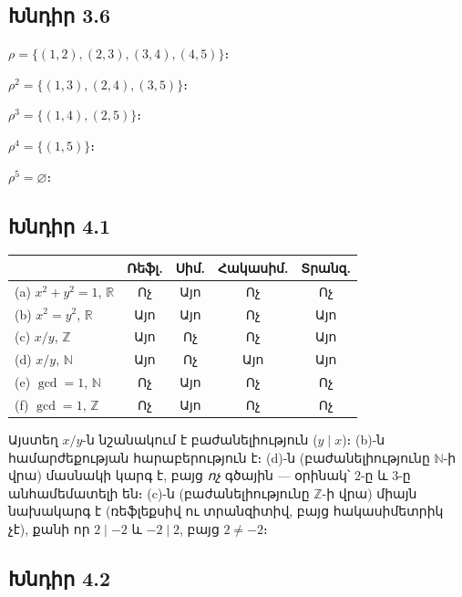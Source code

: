 
\subsection*{Խնդիր 3.6}

$\rho=\{(1,2),(2,3),(3,4),(4,5)\}$։

$\boxed{\rho^2=\{(1,3),(2,4),(3,5)\}}$։

$\boxed{\rho^3=\{(1,4),(2,5)\}}$։

$\boxed{\rho^4=\{(1,5)\}}$։

$\boxed{\rho^5=\varnothing}$։


\subsection*{Խնդիր 4.1}

\begin{tabular}{l|cccc}
& Ռեֆլ. & Սիմ. & Հակասիմ. & Տրանզ. \\\hline
(a) $x^2+y^2=1$, $\mathbb{R}$ & Ոչ & Այո & Ոչ & Ոչ \\
(b) $x^2=y^2$, $\mathbb{R}$   & Այո & Այո & Ոչ & Այո \\
(c) $x/y$, $\mathbb{Z}$       & Այո & Ոչ  & Ոչ  & Այո \\
(d) $x/y$, $\mathbb{N}$       & Այո & Ոչ  & Այո & Այո \\
(e) $\gcd=1$, $\mathbb{N}$    & Ոչ  & Այո & Ոչ  & Ոչ \\
(f) $\gcd=1$, $\mathbb{Z}$    & Ոչ  & Այո & Ոչ  & Ոչ
\end{tabular}

\smallskip
Այստեղ $x/y$-ն նշանակում է բաժանելիություն ($y\mid x$)։ (b)-ն համարժեքության հարաբերություն է։ (d)-ն (բաժանելիությունը $\mathbb{N}$-ի վրա) մասնակի կարգ է, բայց \emph{ոչ} գծային — օրինակ՝ $2$-ը և $3$-ը անհամեմատելի են։ (c)-ն (բաժանելիությունը $\mathbb{Z}$-ի վրա) միայն նախակարգ է (ռեֆլեքսիվ ու տրանզիտիվ, բայց հակասիմետրիկ չէ), քանի որ $2\mid -2$ և $-2\mid 2$, բայց $2\ne -2$։


\subsection*{Խնդիր 4.2}

